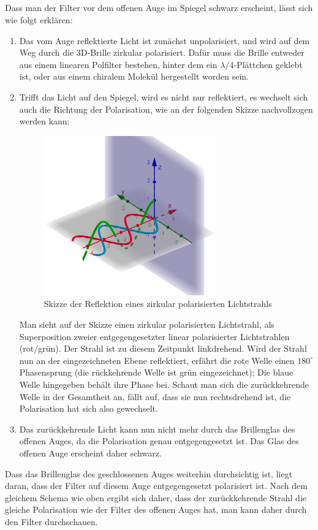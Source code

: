 \documentclass[ex]{exercise}
\begin{document}
\subsection{}
Dass man der Filter vor dem offenen Auge im Spiegel schwarz erscheint, 
lässt sich wie folgt erklären:
\begin{enumerate}
    \item Das vom Auge reflektierte Licht ist zunächst unpolarisiert, und 
    wird auf dem Weg durch die 3D-Brille zirkular polarisiert. Dafür muss die Brille 
    entweder aus einem linearen Polfilter bestehen, hinter dem ein \(\lambda/4\)-Plättchen geklebt ist,
    oder aus einem chiralem Molekül hergestellt worden sein.
    \item Trifft das Licht auf den Spiegel, wird es nicht nur reflektiert, es 
    wechselt sich auch die Richtung der Polarisation, wie an der folgenden Skizze 
    nachvollzogen werden kann:
    \begin{figure}[H]
        \centering
        \includegraphics[width=0.7\textwidth]{1.jpg}
        \caption{Skizze der Reflektion eines zirkular polarisierten Lichtstrahls}
    \end{figure}
    Man sieht auf der Skizze einen zirkular polarisierten Lichtstrahl, als Superposition 
    zweier entgegengesetzter linear polarisierter Lichtstrahlen (rot/grün). Der Strahl ist
    zu diesem Zeitpunkt linkdrehend. Wird der Strahl nun an der eingezeichneten Ebene 
    reflektiert, erfährt die rote Welle einen \(180^\circ\) Phasensprung (die rückkehrende 
    Welle ist grün eingezeichnet); Die blaue Welle hingegeben behält ihre Phase bei. 
    Schaut man sich die zurückkehrende Welle in der Gesamtheit an, 
    fällt auf, dass sie nun rechtsdrehend ist, die Polarisation hat sich also gewechselt.

    \item Das zurückkehrende Licht kann nun nicht mehr durch das Brillenglas des offenen
    Auges, da die Polarisation genau entgegengesetzt ist. Das Glas des offenen Auge 
    erscheint daher schwarz.
\end{enumerate}
Dass das Brillenglas des geschlossenen Auges weiterhin durchsichtig ist, liegt daran,
dass der Filter auf diesem Auge entgegengesetzt polarisiert ist. Nach dem gleichem Schema
wie oben ergibt sich daher, dass der zurückkehrende Strahl die gleiche Polarisation wie der Filter 
des offenen Auges hat, man kann daher durch den Filter durchschauen.
\end{document}
